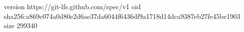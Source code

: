 version https://git-lfs.github.com/spec/v1
oid sha256:a869c074a0d80e2d6ae37da6044f6436df9a1718d14dca9387eb27fe45be1903
size 299340
